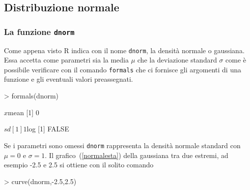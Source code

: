 \documentclass[onecolumn,12pt]{book}
\newenvironment{solution}{\textbf{Soluzione}\newline}{}
\newenvironment{answerlist}{\renewcommand{\labelenumi}{(\alph{enumi})}\begin{enumerate}}{\end{enumerate}}
\begin{document}

\subsection{Distribuzione normale}
\subsubsection{La funzione \texttt{dnorm}}
Come appena visto \textsf{R }indica con il nome \texttt{dnorm}, la densit\`a normale o gaussiana. Essa accetta come parametri sia la media $\mu$ che la deviazione standard $\sigma$ come \`e possibile verificare con il comando \texttt{formals} che ci fornisce gli argomenti di una funzione e gli eventuali valori preassegnati.
\begin{Schunk}
\begin{Sinput}
> formals(dnorm)
\end{Sinput}
\begin{Soutput}
$x


$mean
[1] 0

$sd
[1] 1

$log
[1] FALSE
\end{Soutput}
\end{Schunk}
Se i parametri sono omessi \texttt{dnorm} rappresenta la densit\`a normale standard con $\mu=0$ e $\sigma=1$.
Il grafico~(\ref{normalesta}) della gaussiana
 tra due estremi, ad esempio -2.5 e 2.5 si ottiene con il solito comando
\begin{Schunk}
\begin{Sinput}
> curve(dnorm,-2.5,2.5)
\end{Sinput}
\end{Schunk}
\end{document}
